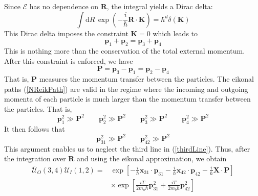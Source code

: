 Since $\mathcal{E}$ has no dependence on $\mathbf{R}$, the integral yields a Dirac delta:
\begin{equation}
	\int \mathrm{d}R \, \exp{\left(- \frac{i}{\hbar} \mathbf{R} \cdot \mathbf{K} \right)} = \hbar^{d} \delta(\mathbf{K})
\end{equation}
This Dirac delta imposes the constraint $\mathbf{K} = 0$ which leads to
\begin{equation}
	\mathbf{p}_{1} + \mathbf{p}_{2} = \mathbf{p}_{3} + \mathbf{p}_{4}
\end{equation}
This is nothing more than the conservation of the total external momentum. After this constraint is enforced, we have
\begin{equation}
	\mathbf{P} = \mathbf{p}_{3} - \mathbf{p}_{1} = \mathbf{p}_{2} - \mathbf{p}_{4}
\end{equation}
That is, $\mathbf{P}$ measures the momentum transfer between the particles. The eikonal paths (\ref{NReikPath}) are valid in the regime where the incoming and outgoing momenta of each particle is much larger than the momentum transfer between the particles. That is,
\begin{equation}
	\mathbf{p}_{1}^{2} \gg \mathbf{P}^{2} \qquad \mathbf{p}_{2}^{2} \gg \mathbf{P}^{2} \qquad \mathbf{p}_{3}^{2} \gg \mathbf{P}^{2} \qquad \mathbf{p}_{4}^{2} \gg \mathbf{P}^{2}
\end{equation}
It then follows that
\begin{equation}
	\mathbf{p}_{31}^{2} \gg \mathbf{P}^{2} \qquad \mathbf{p}_{42}^{2} \gg \mathbf{P}^{2}
\end{equation}
This argument enables us to neglect the third line in (\ref{thirdLine}). Thus, after the integration over $\mathbf{R}$ and using the eikonal approximation, we obtain
\begin{equation}
\begin{split}
	\overline{\mathcal{U}}_{O}(3,4) \mathcal{U}_{I}(1,2) = {}& \exp{\left[ -\frac{i}{\hbar} \mathbf{x}_{31} \cdot \mathbf{p}_{31} - \frac{i}{\hbar} \mathbf{x}_{42} \cdot \mathbf{p}_{42} - \frac{i}{\hbar} \mathbf{X} \cdot \mathbf{P} \right]} \\
	&\times \exp{\left[ \frac{i T}{2 m_{a} \hbar} \mathbf{p}_{31}^{2} + \frac{i T}{2 m_{b} \hbar} \mathbf{p}_{42}^{2} \right]}
\end{split}
\end{equation}

